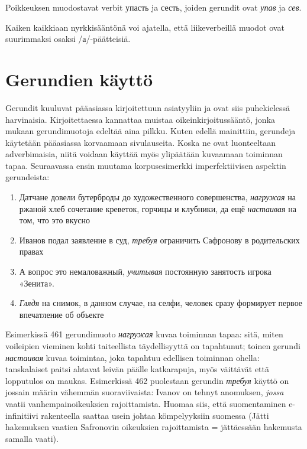 \documentclass[]{scrreprt}
\providecommand{\tightlist}{%
  \setlength{\itemsep}{0pt}\setlength{\parskip}{0pt}}
\begin{document}
Poikkeuksen muodostavat verbit упасть ja сесть, joiden gerundit ovat
\emph{упав} ja \emph{сев}.

Kaiken kaikkiaan nyrkkisääntönä voi ajatella, että liikeverbeillä muodot
ovat suurimmaksi osaksi /а/-päätteisiä.

\section{Gerundien käyttö}\label{gerundien-kuxe4yttuxf6}

Gerundit kuuluvat pääasiassa kirjoitettuun asiatyyliin ja ovat siis
puhekielessä harvinaisia. Kirjoitettaessa kannattaa muistaa
oikeinkirjoitussääntö, jonka mukaan gerundimuotoja edeltää aina pilkku.
Kuten edellä mainittiin, gerundeja käytetään pääasiassa korvaamaan
sivulauseita. Koska ne ovat luonteeltaan adverbimaisia, niitä voidaan
käyttää myös ylipäätään kuvaamaan toiminnan tapaa. Seuraavassa ensin
muutama korpusesimerkki imperfektiivisen aspektin gerundeista:

\begin{enumerate}
\def\labelenumi{(\arabic{enumi})}
\setcounter{enumi}{460}
\tightlist
\item
  Датчане довели бутерброды до художественного совершенства,
  \emph{нагружая} на ржаной хлеб сочетание креветок, горчицы и клубники,
  да ещё \emph{настаивая} на том, что это вкусно
\item
  Иванов подал заявление в суд, \emph{требуя} ограничить Сафронову в
  родительских правах
\item
  А вопрос это немаловажный, \emph{учитывая} постоянную занятость игрока
  «Зенита».
\item
  \emph{Глядя} на снимок, в данном случае, на селфи, человек сразу
  формирует первое впечатление об объекте
\end{enumerate}

Esimerkissä 461 gerundimuoto \emph{нагружая} kuvaa toiminnan tapaa:
sitä, miten voileipien vieminen kohti taiteellista täydellisyyttä on
tapahtunut; toinen gerundi \emph{настаивая} kuvaa toimintaa, joka
tapahtuu edellisen toiminnan ohella: tanskalaiset paitsi ahtavat leivän
päälle katkarapuja, myös väittävät että lopputulos on maukas.
Esimerkissä 462 puolestaan gerundin \emph{требуя} käyttö on jossain
määrin vähemmän suoraviivaista: Ivanov on tehnyt anomuksen, \emph{jossa}
vaatii vanhempainoikeuksien rajoittamista. Huomaa siis, että
suomentaminen e-infinitiivi rakenteella saattaa usein johtaa
kömpelyyksiin suomessa (Jätti hakemuksen vaatien Safronovin oikeuksien
rajoittamista = jättäessään hakemusta samalla vaati).
\end{document}
